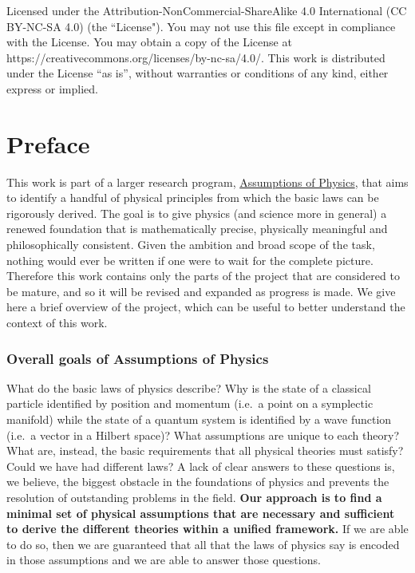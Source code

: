 \documentclass[11pt,letterpaper,fleqn]{memoir} %
\begin{document}
\vspace{12pt}

\noindent Licensed under the Attribution-NonCommercial-ShareAlike 4.0 International (CC BY-NC-SA 4.0) (the ``License"). You may not use this file except in compliance with the License. You may obtain a copy of the License at https://creativecommons.org/licenses/by-nc-sa/4.0/. This work is distributed under the License ``as is'', without warranties or conditions of any kind, either express or implied.

\chapter{Preface}

This work is part of a larger research program, \href{https://assumptionsofphysics.org}{Assumptions of Physics}, that aims to identify a handful of physical principles from which the basic laws can be rigorously derived. The goal is to give physics (and science more in general) a renewed foundation that is mathematically precise, physically meaningful and philosophically consistent. Given the ambition and broad scope of the task, nothing would ever be written if one were to wait for the complete picture. Therefore this work contains only the parts of the project that are considered to be mature, and so it will be revised and expanded as progress is made. We give here a brief overview of the project, which can be useful to better understand the context of this work.

\subsection{Overall goals of Assumptions of Physics}

What do the basic laws of physics describe? Why is the state of a classical particle identified by position and momentum (i.e.~a point on a symplectic manifold) while the state of a quantum system is identified by a wave function (i.e.~a vector in a Hilbert space)? What assumptions are unique to each theory? What are, instead, the basic requirements that all physical theories must satisfy? Could we have had different laws? A lack of clear answers to these questions is, we believe, the biggest obstacle in the foundations of physics and prevents the resolution of outstanding problems in the field. \textbf{Our approach is to find a minimal set of physical assumptions that are necessary and sufficient to derive the different theories within a unified framework.} If we are able to do so, then we are guaranteed that all that the laws of physics say is encoded in those assumptions and we are able to answer those questions.
\end{document}
